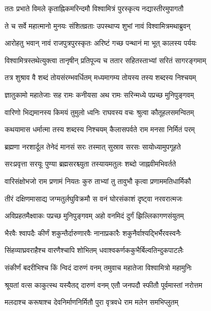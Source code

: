 
\twolineshloka
{ततः प्रभाते विमले कृताह्निकमरिन्दमौ}
{विश्वामित्रं पुरस्कृत्य नद्यास्तीरमुपागतौ} %

\twolineshloka
{ते च सर्वे महात्मानो मुनयः संशितव्रताः}
{उपस्थाप्य शुभां नावं विश्वामित्रमथाब्रुवन्} %

\twolineshloka
{आरोहतु भवान् नावं राजपुत्रपुरस्कृतः}
{अरिष्टं गच्छ पन्थानं मा भूत् कालस्य पर्ययः} %

\twolineshloka
{विश्वामित्रस्तथेत्युक्त्वा तानृषीन् प्रतिपूज्य च}
{ततार सहितस्ताभ्यां सरितं सागरङ्गमाम्} %

\twolineshloka
{तत्र शुश्राव वै शब्दं तोयसंरम्भवर्धितम्}
{मध्यमागम्य तोयस्य तस्य शब्दस्य निश्चयम्} %

\twolineshloka
{ज्ञातुकामो महातेजाः सह रामः कनीयसा}
{अथ रामः सरिन्मध्ये पप्रच्छ मुनिपुङ्गवम्} %

\twolineshloka
{वारिणो भिद्यमानस्य किमयं तुमुलो ध्वनिः}
{राघवस्य वचः श्रुत्वा कौतूहलसमन्वितम्} %

\twolineshloka
{कथयामास धर्मात्मा तस्य शब्दस्य निश्चयम्}
{कैलासपर्वते राम मनसा निर्मितं परम्} %

\twolineshloka
{ब्रह्मणा नरशार्दूल तेनेदं मानसं सरः}
{तस्मात् सुस्राव सरसः सायोध्यामुपगूहते} %

\twolineshloka
{सरःप्रवृत्ता सरयूः पुण्या ब्रह्मसरश्च्युता}
{तस्यायमतुलः शब्दो जाह्नवीमभिवर्तते} %

\twolineshloka
{वारिसंक्षोभजो राम प्रणामं नियतः कुरु}
{ताभ्यां तु तावुभौ कृत्वा प्रणाममतिधार्मिकौ} %

\twolineshloka
{तीरं दक्षिणमासाद्य जग्मतुर्लघुविक्रमौ}
{स वनं घोरसंकाशं दृष्ट्वा नरवरात्मजः} %

\twolineshloka
{अविप्रहतमैक्ष्वाकः पप्रच्छ मुनिपुङ्गवम्}
{अहो वनमिदं दुर्गं झिल्लिकागणसंयुतम्} %

\twolineshloka
{भैरवैः श्वापदैः कीर्णं शकुन्तैर्दारुणारवैः}
{नानाप्रकारैः शकुनैर्वाश्यद्भिर्भैरवस्वनैः} %

\twolineshloka
{सिंहव्याघ्रवराहैश्च वारणैश्चापि शोभितम्}
{धवाश्वकर्णककुभैर्बिल्वतिन्दुकपाटलैः} %

\twolineshloka
{संकीर्णं बदरीभिश्च किं न्विदं दारुणं वनम्}
{तमुवाच महातेजा विश्वामित्रो महामुनिः} %

\twolineshloka
{श्रूयतां वत्स काकुत्स्थ यस्यैतद् दारुणं वनम्}
{एतौ जनपदौ स्फीतौ पूर्वमास्तां नरोत्तम} %

\twolineshloka
{मलदाश्च करूषाश्च देवनिर्माणनिर्मितौ}
{पुरा वृत्रवधे राम मलेन समभिप्लुतम्} %

